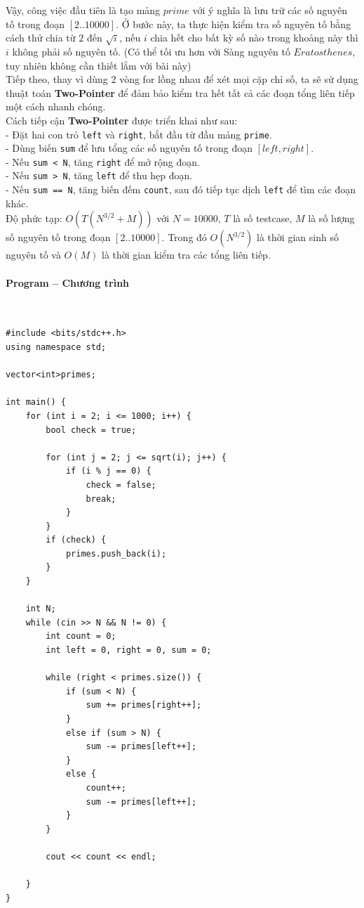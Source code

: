 \documentclass{article}
\begin{document}
Vậy, công việc đầu tiên là tạo mảng $prime$ với ý nghĩa là lưu trữ các số nguyên tố trong đoạn $[2..10000]$. Ở bước này, ta thực hiện kiểm tra số nguyên tố bằng cách thử chia từ $2$ đến $\sqrt{i}$, nếu $i$ chia hết cho bất kỳ số nào trong khoảng này thì $i$ không phải số nguyên tố. (Có thể tối ưu hơn với Sàng nguyên tố $Eratosthenes$, tuy nhiên không cần thiết lắm với bài này)\\

Tiếp theo, thay vì dùng 2 vòng for lồng nhau để xét mọi cặp chỉ số, ta sẽ sử dụng thuật toán \textbf{Two-Pointer} để đảm bảo kiểm tra hết tất cả các đoạn tổng liên tiếp một cách nhanh chóng. \\

Cách tiếp cận \textbf{Two-Pointer} được triển khai như sau: \\

- Đặt hai con trỏ \texttt{left} và \texttt{right}, bắt đầu từ đầu mảng \texttt{prime}. \\
- Dùng biến \texttt{sum} để lưu tổng các số nguyên tố trong đoạn $[left, right]$. \\
- Nếu \texttt{sum < N}, tăng \texttt{right} để mở rộng đoạn. \\
- Nếu \texttt{sum > N}, tăng \texttt{left} để thu hẹp đoạn. \\
- Nếu \texttt{sum == N}, tăng biến đếm \texttt{count}, sau đó tiếp tục dịch \texttt{left} để tìm các đoạn khác. \\

Độ phức tạp: $O(T(N^{3/2} + M))$ với $N = 10000$, $T$ là số testcase, $M$ là số lượng số nguyên tố trong đoạn $[2..10000]$. Trong đó $O(N^{3/2})$ là thời gian sinh số nguyên tố và $O(M)$ là thời gian kiểm tra các tổng liên tiếp. \\

\paragraph{Program -- Chương trình} \mbox{} \\


\begin{lstlisting}
#include <bits/stdc++.h>
using namespace std;

vector<int>primes;

int main() {
	for (int i = 2; i <= 1000; i++) {
		bool check = true;

		for (int j = 2; j <= sqrt(i); j++) {
			if (i % j == 0) {
				check = false;
				break;
			}
		}
		if (check) {
			primes.push_back(i);
		}
	}

	int N;
	while (cin >> N && N != 0) {
		int count = 0;
		int left = 0, right = 0, sum = 0;

		while (right < primes.size()) {
			if (sum < N) {
				sum += primes[right++];
			}
			else if (sum > N) {
				sum -= primes[left++];
			}
			else {
				count++;
				sum -= primes[left++];
			}
		}

		cout << count << endl;

	}
}
	
\end{lstlisting}
\end{document}
